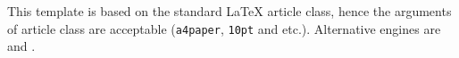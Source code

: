 \documentclass[11pt,en,bibstyle=ieeetr]{elegantpaper}
\begin{document}
This template is based on the standard \LaTeX{} article class, hence the arguments of article class are acceptable (\lstinline{a4paper}, \lstinline{10pt} and etc.). Alternative engines are  and .
%
%
%
%
\end{document}

